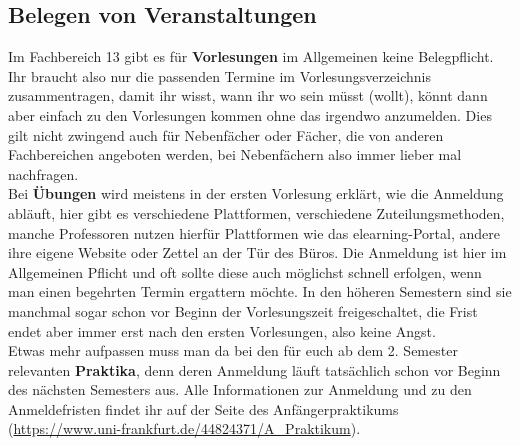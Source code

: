 \subsection{Belegen von Veranstaltungen}
Im Fachbereich 13 gibt es für \textbf{Vorlesungen} im Allgemeinen keine Belegpflicht. Ihr braucht also nur die passenden Termine im Vorlesungsverzeichnis zusammentragen, damit ihr wisst, wann ihr wo sein müsst (wollt), könnt dann aber einfach zu den Vorlesungen kommen ohne das irgendwo anzumelden. Dies gilt nicht zwingend auch für Nebenfächer oder Fächer, die von anderen Fachbereichen angeboten werden, bei Nebenfächern also immer lieber mal nachfragen. \\
Bei \textbf{Übungen} wird meistens in der ersten Vorlesung erklärt, wie die Anmeldung abläuft, hier gibt es verschiedene Plattformen, verschiedene Zuteilungsmethoden, manche Professoren nutzen hierfür Plattformen wie das elearning-Portal, andere ihre eigene Website oder Zettel an der Tür des Büros. Die Anmeldung ist hier im Allgemeinen Pflicht und oft sollte diese auch möglichst schnell erfolgen, wenn man einen begehrten Termin ergattern möchte. In den höheren Semestern sind sie manchmal sogar schon vor Beginn der Vorlesungszeit freigeschaltet, die Frist endet aber immer erst nach den ersten Vorlesungen, also keine Angst. \\
Etwas mehr aufpassen muss man da bei den für euch ab dem 2. Semester relevanten \textbf{Praktika}, denn deren Anmeldung läuft tatsächlich schon vor Beginn des nächsten Semesters aus. Alle Informationen zur Anmeldung und zu den Anmeldefristen findet ihr auf der Seite des Anfängerpraktikums (\url{https://www.uni-frankfurt.de/44824371/A_Praktikum}).
%
%
